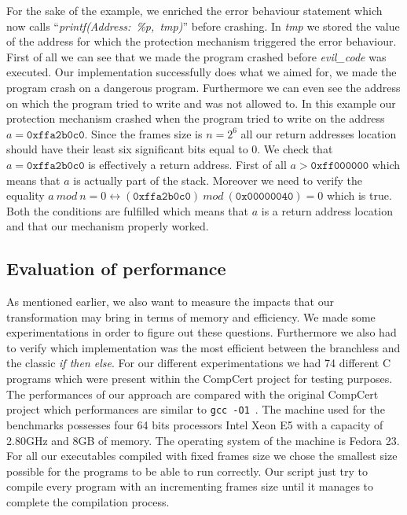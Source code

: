 \documentclass[11pt]{sdm}
\begin{document}
For the sake of the example, we enriched the error behaviour statement which now calls  ``\textit{printf(Address:~\%p,~tmp)}'' before crashing. In \textit{tmp} we stored the value of the address for which the protection mechanism triggered the error behaviour.
First of all we can see that we made the program crashed before \textit{evil\_code} was executed. Our implementation successfully does what we aimed for, we made the program crash on a dangerous program.
Furthermore we can even see the address on which the program tried to write and was not allowed to. In this example our protection mechanism crashed when the program tried to write on the address $a=\texttt{0xffa2b0c0}$. 
Since the frames size is $n=2^6$ all our return addresses location should have their least six significant bits equal to 0.
We check that $a=\texttt{0xffa2b0c0}$ is effectively a return address. First of all $a>\texttt{0xff000000}$ which means that $a$ is actually part of the stack. Moreover we need to verify the equality $a~mod~n=0 \leftrightarrow (\texttt{0xffa2b0c0})~mod~(\texttt{0x00000040}) = 0$ which is true. 
Both the conditions are fulfilled which means that $a$ is a return address location and that our mechanism properly worked.


\subsection{Evaluation of performance}

As mentioned earlier, we also want to measure the impacts that our transformation may bring in terms of memory and efficiency.
We made some experimentations in order to figure out these questions.
Furthermore we also had to verify which implementation was the most efficient between the branchless and the classic \textit{if then else}.
For our different experimentations we had 74 different C programs which were present within the CompCert project for testing purposes.
The performances of our approach are compared with the original CompCert project which performances are similar to \texttt{gcc -O1}~\cite{Leroy:2009:FVR:1538788.1538814}.
The machine used for the benchmarks possesses four 64 bits processors Intel Xeon E5 with a capacity of 2.80GHz and 8GB of memory. The operating system of the machine is Fedora 23.
For all our executables compiled with fixed frames size we chose the smallest size possible for the programs to be able to run correctly. Our script just try to compile every program with an incrementing frames size until it manages to complete the compilation process.
\end{document}
